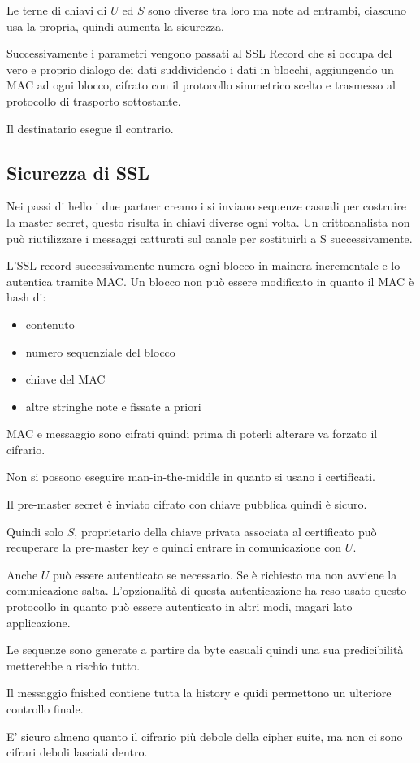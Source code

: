 Le terne di chiavi di $U$ ed $S$ sono diverse tra loro ma note ad entrambi, ciascuno usa la propria, quindi aumenta la sicurezza.

Successivamente i parametri vengono passati al SSL Record che si occupa del vero e proprio dialogo dei dati suddividendo i dati in blocchi, aggiungendo un MAC ad ogni blocco, cifrato con il protocollo simmetrico scelto e trasmesso al protocollo di trasporto sottostante.

Il destinatario esegue il contrario.

\subsection{Sicurezza di SSL}
Nei passi di hello i due partner creano i si inviano sequenze casuali per costruire la master secret, questo risulta in chiavi diverse ogni volta.
Un crittoanalista non può riutilizzare i messaggi catturati sul canale per sostituirli a S successivamente.

L'SSL record successivamente numera ogni blocco in mainera incrementale e lo autentica tramite MAC.
Un blocco non può essere modificato in quanto il MAC è hash di:
\begin{itemize}
    \item contenuto
    \item numero sequenziale del blocco
    \item chiave del MAC
    \item altre stringhe note e fissate a priori
\end{itemize}

MAC e messaggio sono cifrati quindi prima di poterli alterare va forzato il cifrario.

Non si possono eseguire man-in-the-middle in quanto si usano i certificati.

Il pre-master secret è inviato cifrato con chiave pubblica quindi è sicuro.

Quindi solo $S$, proprietario della chiave privata associata al certificato può recuperare la pre-master key e quindi entrare in comunicazione con $U$.

Anche $U$ può essere autenticato se necessario.
Se è richiesto ma non avviene la comunicazione salta.
L'opzionalità di questa autenticazione ha reso usato questo protocollo in quanto può essere autenticato in altri modi, magari lato applicazione.

Le sequenze sono generate a partire da byte casuali quindi una sua predicibilità metterebbe a rischio tutto.

Il messaggio fnished contiene tutta la history e quidi permettono un ulteriore controllo finale.

E' sicuro almeno quanto il cifrario più debole della cipher suite, ma non ci sono cifrari deboli lasciati dentro.

